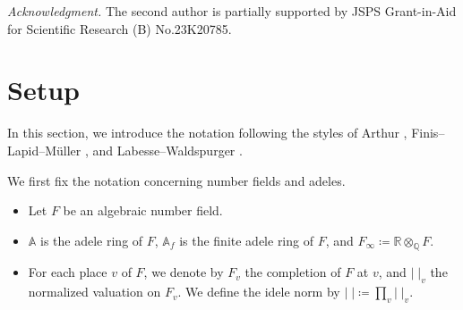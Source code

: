 \documentclass[12pt]{amsart}
\theoremstyle{definition}
\theoremstyle{plain}
\theoremstyle{remark}
\def\R{\mathbb{R}}%
\def\Q{\mathbb{Q}}%
\def\A{\mathbb{A}}%
\def\inf{\infty}
\numberwithin{equation}{section}
\begin{document}
\medskip
{\em Acknowledgment.}
The second author is partially supported by JSPS Grant-in-Aid for Scientific Research (B) No.23K20785. 

\section{Setup}\label{sec:setup}

In this section, we introduce the notation following the styles of Arthur \cites{Art88b,Art05}, Finis--Lapid--M\"uller \cite{FLM11}, and Labesse--Waldspurger \cite{LW13}. 


We first fix the notation concerning number fields and adeles.
\begin{itemize}
    \item Let $F$ be an algebraic number field.
    \item $\A$ is the adele ring of $F$, $\A_f$ is the finite adele ring of $F$, and $F_\inf \coloneqq \R\otimes_\Q F$. 
    \item For each place $v$ of $F$, we denote by $F_v$ the completion of $F$ at $v$, and $|\;|_v$ the normalized valuation on $F_v$. 
    We define the idele norm by $|\;|\coloneqq\prod_v |\;|_v$. 
\end{itemize}
\end{document}
